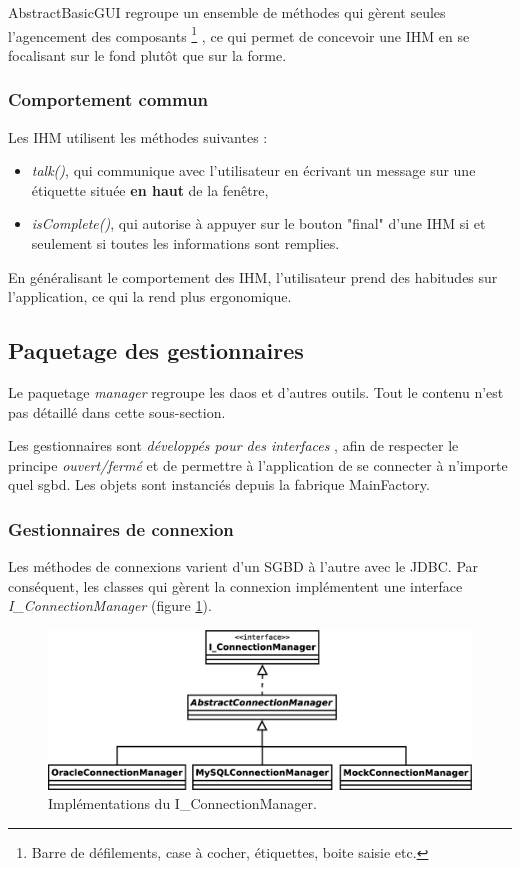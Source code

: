 AbstractBasicGUI regroupe un ensemble de méthodes qui gèrent seules l'agencement des composants
\footnote{\label{composants_ihm}Barre de défilements, case à cocher, étiquettes, boite saisie etc.}
, ce qui permet de concevoir une IHM en se focalisant sur le fond plutôt que sur la forme.

\subsubsection{Comportement commun}
Les IHM utilisent les méthodes suivantes :
\begin{itemize}
\item \textit{talk()}, qui communique avec l'utilisateur en écrivant un message sur une étiquette située \textbf{en haut} de la fenêtre,
\item \textit{isComplete()}, qui autorise à appuyer sur le bouton "final" d'une IHM si et seulement si toutes les informations sont remplies.
\end{itemize}

En généralisant le comportement des IHM, l'utilisateur prend des habitudes sur l'application, ce qui la rend plus ergonomique.

\subsection{Paquetage des gestionnaires}
Le paquetage \textit{manager} regroupe les \glspl{dao} et d'autres outils.
Tout le contenu n'est pas détaillé dans cette sous-section.

Les gestionnaires sont \textit{développés pour des interfaces} , afin de respecter le principe \textit{ouvert/fermé} et de permettre à l'application de se connecter à n'importe quel \gls{sgbd}.
Les objets sont instanciés depuis la fabrique MainFactory.

\subsubsection{Gestionnaires de connexion}
Les méthodes de connexions varient d'un SGBD à l'autre avec le \gls{JDBC}.
Par conséquent, les classes qui gèrent la connexion implémentent une interface \textit{I\_ConnectionManager} (figure \ref{connection_managers_uml}).

\begin{figure}[!p]
\centering
\includegraphics[width=14cm]{images/connection_managers.eps}
\caption{Implémentations du I\_ConnectionManager.}
\label{connection_managers_uml}
\end{figure}

